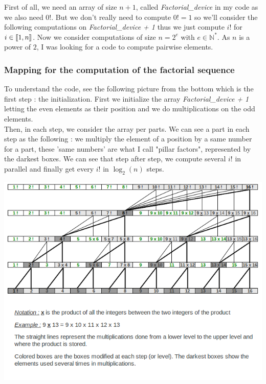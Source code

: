 First of all, we need an array of size $n+1$, called \textit{Factorial\_device} in my code as we also need $0!$. But we don't really need to compute $0! = 1$ so we'll consider the following computations on \textit{Factorial\_device + 1} thus we just compute $i!$ for $i \in \mbox{\textlbrackdbl} 1, n\mbox{\textrbrackdbl}$. Now we consider computations of size $n = 2^e$ with $e \in \mathbb{N}^*$. As $n$ is a power of $2$, I was looking for a code to compute pairwise elements.

\subsubsection{Mapping for the computation of the factorial sequence}

To understand the code, see the following picture from the bottom which is the first step : the initialization. First we initialize the array \textit{Factorial\_device + 1} letting the even elements as their position and we do multiplications on the odd elements. \\

Then, in each step, we consider the array per parts. We can see a part in each step as the following : we multiply the element of a position by a same number for a part, these 'same numbers' are what I call "pillar factors", represented by the darkest boxes. We can see that step after step, we compute several $i!$ in parallel and finally get every $i!$ in $\log_{2}(n)$ steps.\\

\begin{center}
\includegraphics[scale=0.8]{facto.png}
\end{center}

